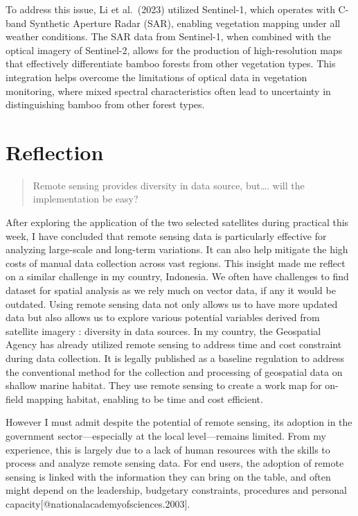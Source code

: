 \documentclass[
  letterpaper,
  DIV=11,
  numbers=noendperiod]{scrreprt}
\begin{document}
To address this issue, Li et al.~(2023) utilized Sentinel-1, which
operates with C-band Synthetic Aperture Radar (SAR), enabling vegetation
mapping under all weather conditions. The SAR data from Sentinel-1, when
combined with the optical imagery of Sentinel-2, allows for the
production of high-resolution maps that effectively differentiate bamboo
forests from other vegetation types. This integration helps overcome the
limitations of optical data in vegetation monitoring, where mixed
spectral characteristics often lead to uncertainty in distinguishing
bamboo from other forest types.

\hypertarget{reflection}{%
\section{Reflection}\label{reflection}}

\begin{quote}
Remote sensing provides diversity in data source, but\ldots. will the
implementation be easy?
\end{quote}

After exploring the application of the two selected satellites during
practical this week, I have concluded that remote sensing data is
particularly effective for analyzing large-scale and long-term
variations. It can also help mitigate the high costs of manual data
collection across vast regions. This insight made me reflect on a
similar challenge in my country, Indonesia. We often have challenges to
find dataset for spatial analysis as we rely much on vector data, if any
it would be outdated. Using remote sensing data not only allows us to
have more updated data but also allows us to explore various potential
variables derived from satellite imagery : diversity in data sources. In
my country, the Geospatial Agency has already utilized remote sensing to
address time and cost constraint during data collection. It is legally
published as a baseline regulation to address the conventional method
for the collection and processing of geospatial data on shallow marine
habitat. They use remote sensing to create a work map for on-field
mapping habitat, enabling to be time and cost efficient.

However I must admit despite the potential of remote sensing, its
adoption in the government sector---especially at the local
level---remains limited. From my experience, this is largely due to a
lack of human resources with the skills to process and analyze remote
sensing data. For end users, the adoption of remote sensing is linked
with the information they can bring on the table, and often might depend
on the leadership, budgetary constraints, procedures and personal
capacity{[}@nationalacademyofsciences.2003{]}.
\end{document}
